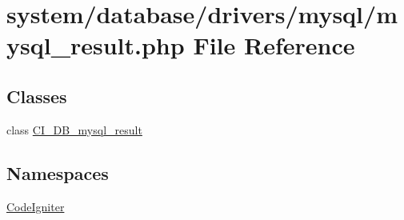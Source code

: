 \hypertarget{mysql__result_8php}{}\section{system/database/drivers/mysql/mysql\+\_\+result.php File Reference}
\label{mysql__result_8php}
\subsection*{Classes}
\begin{DoxyCompactItemize}
\item 
class \mbox{\hyperlink{class_c_i___d_b__mysql__result}{C\+I\+\_\+\+D\+B\+\_\+mysql\+\_\+result}}
\end{DoxyCompactItemize}
\subsection*{Namespaces}
\begin{DoxyCompactItemize}
\item 
 \mbox{\hyperlink{namespace_code_igniter}{Code\+Igniter}}
\end{DoxyCompactItemize}
